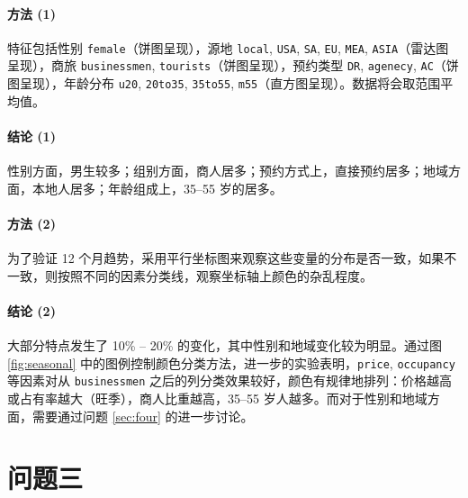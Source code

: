     \paragraph{方法 (1)} 特征包括性别 \verb"female"（饼图呈现），源地 \verb"local", \verb"USA", \verb"SA", \verb"EU", \verb"MEA", \verb"ASIA"（雷达图呈现），商旅 \verb"businessmen", \verb"tourists"（饼图呈现），预约类型 \verb"DR", \verb"agenecy", \verb"AC"（饼图呈现），年龄分布 \verb"u20", \verb"20to35", \verb"35to55", \verb"m55"（直方图呈现）。数据将会取范围平均值。

    \paragraph{结论 (1)} 性别方面，男生较多；组别方面，商人居多；预约方式上，直接预约居多；地域方面，本地人居多；年龄组成上，35--55 岁的居多。

    \paragraph{方法 (2)} 为了验证 12 个月趋势，采用平行坐标图来观察这些变量的分布是否一致，如果不一致，则按照不同的因素分类线，观察坐标轴上颜色的杂乱程度。

    \paragraph{结论 (2)} 


    大部分特点发生了 10\% -- 20\% 的变化，其中性别和地域变化较为明显。通过图 \ref{fig:seasonal} 中的图例控制颜色分类方法，进一步的实验表明，\verb"price", \verb"occupancy" 等因素对从 \verb"businessmen" 之后的列分类效果较好，颜色有规律地排列：价格越高或占有率越大（旺季），商人比重越高，35--55 岁人越多。而对于性别和地域方面，需要通过问题 \ref{sec:four} 的进一步讨论。

    \section{问题三}


